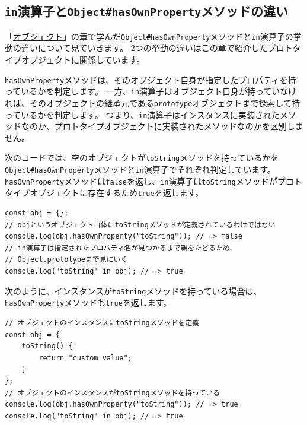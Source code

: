 \hypertarget{diff-in-operator-and-hasOwnProperty}{%
\subsection{\texorpdfstring{\texttt{in}演算子と\texttt{Object\#hasOwnProperty}メソッドの違い}{in演算子とObject\#hasOwnPropertyメソッドの違い}}\label{diff-in-operator-and-hasOwnProperty}}

「\hyperlink{object}{オブジェクト}」の章で学んだ\texttt{Object\#hasOwnProperty}メソッドと\texttt{in}演算子の挙動の違いについて見ていきます。
2つの挙動の違いはこの章で紹介したプロトタイプオブジェクトに関係しています。

\texttt{hasOwnProperty}メソッドは、そのオブジェクト自身が指定したプロパティを持っているかを判定します。
一方、\texttt{in}演算子はオブジェクト自身が持っていなければ、そのオブジェクトの継承元である\texttt{prototype}オブジェクトまで探索して持っているかを判定します。
つまり、\texttt{in}演算子はインスタンスに実装されたメソッドなのか、プロトタイプオブジェクトに実装されたメソッドなのかを区別しません。

次のコードでは、空のオブジェクトが\texttt{toString}メソッドを持っているかを\texttt{Object\#hasOwnProperty}メソッドと\texttt{in}演算子でそれぞれ判定しています。
\texttt{hasOwnProperty}メソッドは\texttt{false}を返し、\texttt{in}演算子は\texttt{toString}メソッドがプロトタイプオブジェクトに存在するため\texttt{true}を返します。

\begin{lstlisting}
const obj = {};
// objというオブジェクト自体にtoStringメソッドが定義されているわけではない
console.log(obj.hasOwnProperty("toString")); // => false
// in演算子は指定されたプロパティ名が見つかるまで親をたどるため、
// Object.prototypeまで見にいく
console.log("toString" in obj); // => true
\end{lstlisting}

次のように、インスタンスが\texttt{toString}メソッドを持っている場合は、\texttt{hasOwnProperty}メソッドも\texttt{true}を返します。

\begin{lstlisting}
// オブジェクトのインスタンスにtoStringメソッドを定義
const obj = {
    toString() {
        return "custom value";
    }
};
// オブジェクトのインスタンスがtoStringメソッドを持っている
console.log(obj.hasOwnProperty("toString")); // => true
console.log("toString" in obj); // => true
\end{lstlisting}

